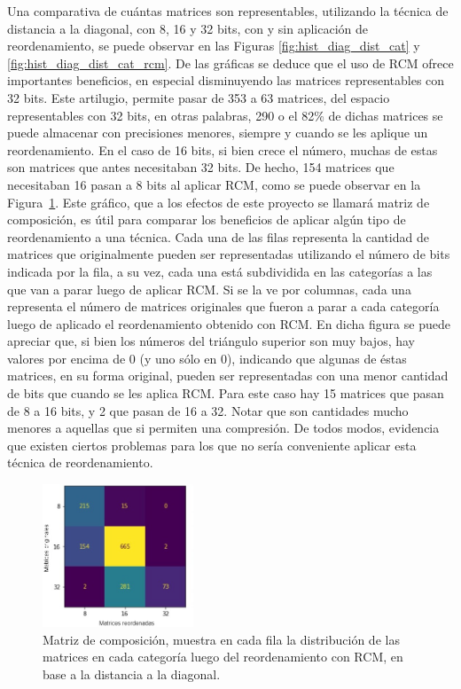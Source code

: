 Una comparativa de cuántas matrices son representables, utilizando la técnica de distancia a la diagonal, con 8, 16 y 32 bits, con y sin aplicación de reordenamiento, se puede observar en las Figuras \ref{fig:hist_diag_dist_cat} y \ref{fig:hist_diag_dist_cat_rcm}. De las gráficas se deduce que el uso de RCM ofrece importantes beneficios, en especial disminuyendo las matrices representables con 32 bits. Este artilugio, permite pasar de 353 a 63 matrices, del espacio representables con 32 bits, en otras palabras, 290 o el 82\% de dichas matrices se puede almacenar con precisiones menores, siempre y cuando se les aplique un reordenamiento. En el caso de 16 bits, si bien crece el número, muchas de estas son matrices que antes necesitaban 32 bits. De hecho, 154 matrices que necesitaban 16 pasan a 8 bits al aplicar RCM, como se puede observar en la  Figura~\ref{fig:confusion_diag_dist}. Este gráfico, que a los efectos de este proyecto se llamará matriz de composición, es útil para comparar los beneficios de aplicar algún tipo de reordenamiento a una técnica. Cada una de las filas representa la cantidad de matrices que originalmente pueden ser representadas utilizando el número de bits indicada por la fila, a su vez, cada una está subdividida en las categorías a las que van a parar luego de aplicar RCM. Si se la ve por columnas, cada una representa el número de matrices originales que fueron a parar a cada categoría luego de aplicado el reordenamiento obtenido con RCM. %
En dicha figura se puede apreciar que, si bien los números del triángulo superior son muy bajos, hay valores por encima de 0 (y uno sólo en 0), indicando que algunas de éstas matrices, en su forma original, pueden ser representadas con una menor cantidad de bits que cuando se les aplica RCM. Para este caso hay 15 matrices que pasan de 8 a 16 bits, y 2 que pasan de 16 a 32. Notar que son cantidades mucho menores a aquellas que si permiten una compresión. De todos modos, evidencia que existen ciertos problemas para los que no sería conveniente aplicar esta técnica de reordenamiento.

\begin{figure}[h]
    \centering
    \includegraphics[width=0.4\textwidth]{imagenes/chap4/confusion_diag_dist.jpg}
    \caption{Matriz de composición, muestra en cada fila la distribución de las matrices en cada categoría luego del reordenamiento con RCM, en base a la distancia a la diagonal.}
    \label{fig:confusion_diag_dist}
\end{figure}


